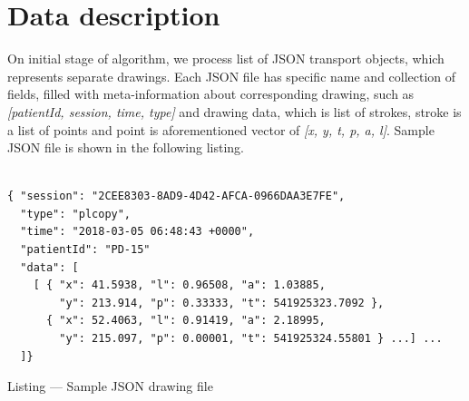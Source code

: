 \section{Data description}

On initial stage of algorithm, we process list of JSON transport objects, which represents separate drawings. Each JSON file has specific name and collection of fields, filled with meta-information about corresponding drawing, such as \textit{[patientId, session, time, type]} and drawing data, which is list of strokes, stroke is a list of points and point is aforementioned vector of \textit{[x, y, t, p, a, l]}. Sample JSON file is shown in the following listing.

\begin{table}[htb]
\centering
\begin{lstlisting}

{ "session": "2CEE8303-8AD9-4D42-AFCA-0966DAA3E7FE",
  "type": "plcopy",
  "time": "2018-03-05 06:48:43 +0000",
  "patientId": "PD-15"
  "data": [
    [ { "x": 41.5938, "l": 0.96508, "a": 1.03885,
        "y": 213.914, "p": 0.33333, "t": 541925323.7092 },
      { "x": 52.4063, "l": 0.91419, "a": 2.18995,
        "y": 215.097, "p": 0.00001, "t": 541925324.55801 } ...] ...
  ]}

\end{lstlisting}
\caption{Listing --- Sample JSON drawing file}
\end{table}

